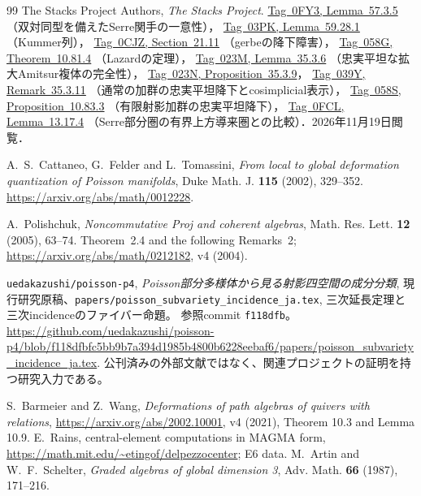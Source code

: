 \documentclass[11pt,a4paper]{ltjsarticle}
\numberwithin{equation}{section}
\begin{document}
\begin{thebibliography}{99}
The Stacks Project Authors, \emph{The Stacks Project}.
\href{https://stacks.math.columbia.edu/tag/0FY3}{Tag~0FY3, Lemma~57.3.5}
（双対同型を備えたSerre関手の一意性），
\href{https://stacks.math.columbia.edu/tag/03PK}{Tag~03PK, Lemma~59.28.1}
（Kummer列），
\href{https://stacks.math.columbia.edu/tag/0CJZ}{Tag~0CJZ, Section~21.11}
（gerbeの降下障害），
\href{https://stacks.math.columbia.edu/tag/058G}{Tag~058G, Theorem~10.81.4}
（Lazardの定理），
\href{https://stacks.math.columbia.edu/tag/023M}{Tag~023M, Lemma~35.3.6}
（忠実平坦な拡大Amitsur複体の完全性），
\href{https://stacks.math.columbia.edu/tag/023N}{Tag~023N, Proposition~35.3.9}，
\href{https://stacks.math.columbia.edu/tag/039Y}{Tag~039Y, Remark~35.3.11}
（通常の加群の忠実平坦降下とcosimplicial表示），
\href{https://stacks.math.columbia.edu/tag/058S}{Tag~058S, Proposition~10.83.3}
（有限射影加群の忠実平坦降下），
\href{https://stacks.math.columbia.edu/tag/0FCL}{Tag~0FCL, Lemma~13.17.4}
（Serre部分圏の有界上方導来圏との比較）．2026年11月19日閲覧．

A.~S.~Cattaneo, G.~Felder and L.~Tomassini,
\emph{From local to global deformation quantization of Poisson manifolds},
Duke Math. J. \textbf{115} (2002), 329--352.
\url{https://arxiv.org/abs/math/0012228}.

A.~Polishchuk,
\emph{Noncommutative Proj and coherent algebras},
Math. Res. Lett. \textbf{12} (2005), 63--74.
Theorem~2.4 and the following Remarks~2;
\url{https://arxiv.org/abs/math/0212182}, v4 (2004).

\texttt{uedakazushi/poisson-p4},
\emph{Poisson部分多様体から見る射影四空間の成分分類},
現行研究原稿、\nolinkurl{papers/poisson_subvariety_incidence_ja.tex},
三次延長定理と三次incidenceのファイバー命題。
参照commit \texttt{f118dfb}。
\url{https://github.com/uedakazushi/poisson-p4/blob/f118dfbfc5bb9b7a394d1985b4800b6228eebaf6/papers/poisson_subvariety_incidence_ja.tex}.
公刊済みの外部文献ではなく、関連プロジェクトの証明を持つ研究入力である。

 S.~Barmeier and Z.~Wang,
\emph{Deformations of path algebras of quivers with relations},
\url{https://arxiv.org/abs/2002.10001}, v4 (2021), Theorem 10.3 and Lemma 10.9.
 E.~Rains, central-element computations in MAGMA form,
\url{https://math.mit.edu/~etingof/delpezzocenter}; E6 data.
M.~Artin and W.~F.~Schelter,
\textit{Graded algebras of global dimension 3},
Adv. Math. \textbf{66} (1987), 171--216.


\end{thebibliography}
\end{document}
